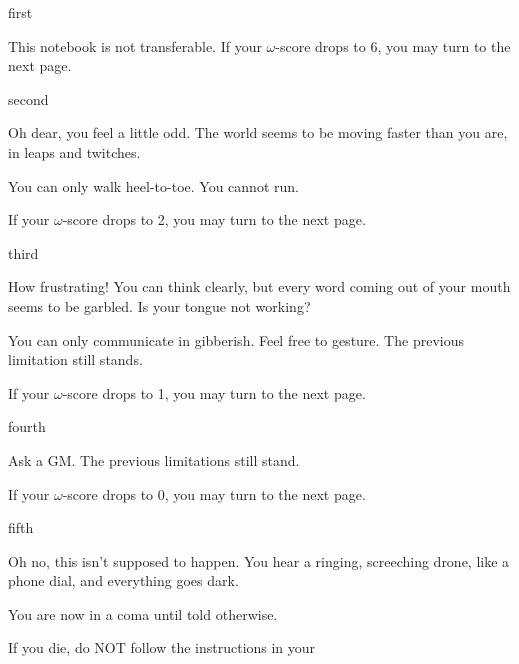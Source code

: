 \documentclass[greennotebook]{guildcamp1} %
\begin{document}
\startnotebook{\nGreenTest{}}



\begin{page}{first}

This notebook is not transferable. If your $\omega$-score drops to 6, you may turn to the next page.

\end{page}


\begin{page}{second}

Oh dear, you feel a little odd. The world seems to be moving faster than you are, in leaps and twitches.

You can only walk heel-to-toe. You cannot run.

If your $\omega$-score drops to 2, you may turn to the next page.

\end{page}



\begin{page}{third}

How frustrating! You can think clearly, but every word coming out of your mouth seems to be garbled. Is your tongue not working?

You can only communicate in gibberish. Feel free to gesture. The previous limitation still stands.

If your $\omega$-score drops to 1, you may turn to the next page.

\end{page}



\begin{page}{fourth}

Ask a GM.
The previous limitations still stand. 

If your $\omega$-score drops to 0, you may turn to the next page.

\end{page}



\begin{page}{fifth}

Oh no, this isn't supposed to happen. You hear a ringing, screeching drone, like a phone dial, and everything goes dark.

You are now in a coma until told otherwise.

If you die, do NOT follow the instructions in your %

\end{page}



\endnotebook
\end{document}
